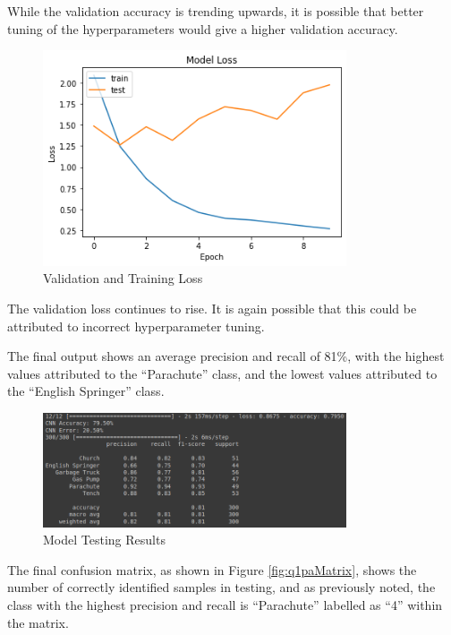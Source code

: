 While the validation accuracy is trending upwards, it is possible that better
tuning of the hyperparameters would give a higher validation accuracy.

\begin{figure}[H]
	\centering
	\includegraphics[width=0.8\textwidth]{images/q1/pa/loss}
	\caption{Validation and Training Loss}
	\label{fig:q1paLoss}
\end{figure}

The validation loss continues to rise. It is again possible that this could be
attributed to incorrect hyperparameter tuning.

The final output shows an average precision and recall of 81\%, with the highest
values attributed to the ``Parachute'' class, and the lowest values attributed
to the ``English Springer'' class.

\begin{figure}[H]
	\centering
	\includegraphics[width=0.8\textwidth]{images/q1/pa/results}
	\caption{Model Testing Results}
	\label{fig:q1paRes}
\end{figure}

The final confusion matrix, as shown in Figure \ref{fig:q1paMatrix}, shows the
number of correctly identified samples in testing, and as previously noted, the
class with the highest precision and recall is ``Parachute'' labelled as ``4''
within the matrix.

